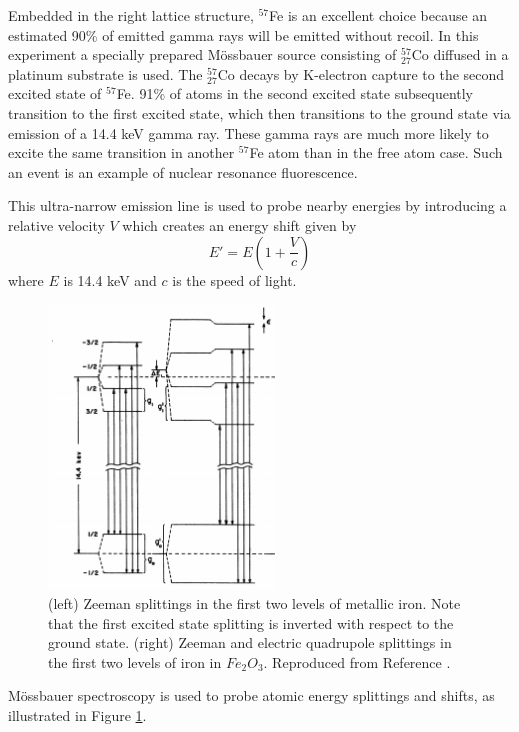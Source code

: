 Embedded in the right lattice structure, $^{57}$Fe is an excellent choice because an estimated 90\% \cite{mel} of emitted gamma rays will be emitted without recoil. In this experiment a specially prepared M{\"o}ssbauer source consisting of $^{57}_{27}$Co diffused in a platinum substrate is used. The $^{57}_{27}$Co decays by K-electron capture to the second excited state of $^{57}$Fe. 91\% of atoms in the second excited state subsequently transition to the first excited state, which then transitions to the ground state via emission of a 14.4 keV gamma ray. These gamma rays are much more likely to excite the same transition in another $^{57}$Fe atom than in the free atom case. Such an event is an example of nuclear resonance fluorescence. 

This ultra-narrow emission line is used to probe nearby energies by introducing a relative velocity $V$ which creates an energy shift given by 
\begin{equation}
E' = E \left(1+\frac{V}{c} \right)
\label{eq:dop}
\end{equation}
where $E$ is 14.4 keV and $c$ is the speed of light.

\begin{figure}[htb]
\includegraphics[width=6cm]{spec.png}
\caption{(left) Zeeman splittings in the first two levels of metallic iron. Note that the first excited state splitting is inverted with respect to the ground state. (right) Zeeman and electric quadrupole splittings in the first two levels of iron in $Fe_2O_3$. Reproduced from Reference \cite{kistner}.}
\label{fig:spec}
\end{figure}

M{\"o}ssbauer spectroscopy is used to probe atomic energy splittings and shifts, as illustrated in Figure \ref{fig:spec}. 

